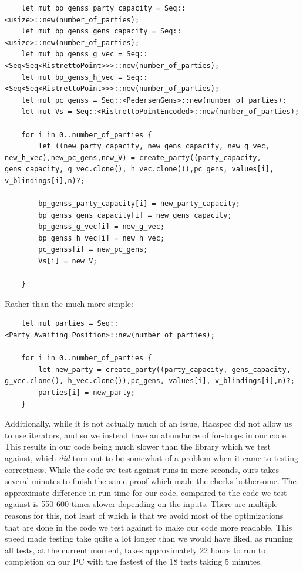\documentclass{article}
\begin{document}
\begin{lstlisting}
	let mut bp_genss_party_capacity = Seq::<usize>::new(number_of_parties);
	let mut bp_genss_gens_capacity = Seq::<usize>::new(number_of_parties);
	let mut bp_genss_g_vec = Seq::<Seq<Seq<RistrettoPoint>>>::new(number_of_parties);
	let mut bp_genss_h_vec = Seq::<Seq<Seq<RistrettoPoint>>>::new(number_of_parties);
	let mut pc_genss = Seq::<PedersenGens>::new(number_of_parties);
	let mut Vs = Seq::<RistrettoPointEncoded>::new(number_of_parties);

	for i in 0..number_of_parties {
		let ((new_party_capacity, new_gens_capacity, new_g_vec, new_h_vec),new_pc_gens,new_V) = create_party((party_capacity, gens_capacity, g_vec.clone(), h_vec.clone()),pc_gens, values[i], v_blindings[i],n)?;
		
		bp_genss_party_capacity[i] = new_party_capacity;
		bp_genss_gens_capacity[i] = new_gens_capacity;
		bp_genss_g_vec[i] = new_g_vec;
		bp_genss_h_vec[i] = new_h_vec;
		pc_genss[i] = new_pc_gens;
		Vs[i] = new_V;

	}
\end{lstlisting}

Rather than the much more simple:

\begin{lstlisting}
	let mut parties = Seq::<Party_Awaiting_Position>::new(number_of_parties);

	for i in 0..number_of_parties {
		let new_party = create_party((party_capacity, gens_capacity, g_vec.clone(), h_vec.clone()),pc_gens, values[i], v_blindings[i],n)?;
		parties[i] = new_party;
	}
	\end{lstlisting}

Additionally, while it is not actually much of an issue, Hacspec did not allow us to use iterators, and so we instead have an abundance of for-loops in our code. This results in our code being much slower than the library which we test against, which \textit{did} turn out to be somewhat of a problem when it came to testing correctness. While the code we test against runs in mere seconds, ours takes several minutes to finish the same proof which made the checks bothersome. The approximate difference in run-time for our code, compared to the code we test against is 550-600 times slower depending on the inputs. There are multiple reasons for this, not least of which is that we avoid most of the optimizations that are done in the code we test against to make our code more readable. This speed made testing take quite a lot longer than we would have liked, as running all tests, at the current moment, takes approximately 22 hours to run to completion on our PC with the fastest of the 18 tests taking 5 minutes.
\end{document}
